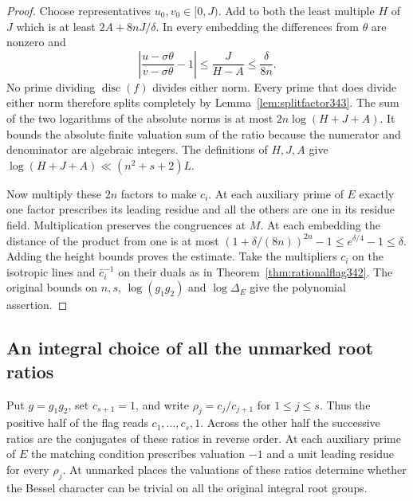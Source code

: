 \documentclass[a4paper,11pt]{article}
\theoremstyle{definition}
\theoremstyle{remark}
\numberwithin{equation}{section}
\begin{document}
\begin{proof}
Choose representatives $u_0,v_0\in[0,J)$. Add to both the least
multiple $H$ of $J$ which is at least $2A+8nJ/\delta$. In every
embedding the differences from $\theta$ are nonzero and
\[
 \left|\frac{u-\sigma\theta}{v-\sigma\theta}-1\right|
       \le \frac{J}{H-A}\le\frac{\delta}{8n}.
\]
No prime dividing $\operatorname{disc}(f)$ divides either norm.
Every prime that does divide either norm therefore splits completely
by Lemma~\ref{lem:splitfactor343}. The sum of the two logarithms of
the absolute norms is at most $2n\log(H+J+A)$. It bounds the
absolute finite valuation sum of the ratio because the numerator and
denominator are algebraic integers. The definitions of $H,J,A$ give
$\log(H+J+A)\ll(n^2+s+2)L$.

Now multiply these $2n$ factors to make $c_i$. At each auxiliary
prime of $E$ exactly one factor prescribes its leading residue and
all the others are one in its residue field. Multiplication preserves
the congruences at $M$. At each embedding the distance of the product
from one is at most $(1+\delta/(8n))^{2n}-1\le e^{\delta/4}-1\le\delta$.
Adding the height bounds proves the estimate. Take the multipliers
$c_i$ on the isotropic lines and $\bar c_i^{-1}$ on their duals as
in Theorem~\ref{thm:rationalflag342}. The original bounds on $n,s$,
$\log(g_1g_2)$ and $\log\Delta_E$ give the polynomial assertion.
\end{proof}


\subsection{An integral choice of all the unmarked root ratios}\label{sec:dominantflag344}
Put $g=g_1g_2$, set $c_{s+1}=1$, and write $\rho_j=c_j/c_{j+1}$
for $1\le j\le s$. Thus the positive half of the flag reads
$c_1,\ldots,c_s,1$. Across the other half the successive ratios are
the conjugates of these ratios in reverse order. At each auxiliary
prime of $E$ the matching condition prescribes valuation $-1$ and
a unit leading residue for every $\rho_j$. At unmarked places
the valuations of these ratios determine whether the Bessel
character can be trivial on all the original integral root groups.
\end{document}
